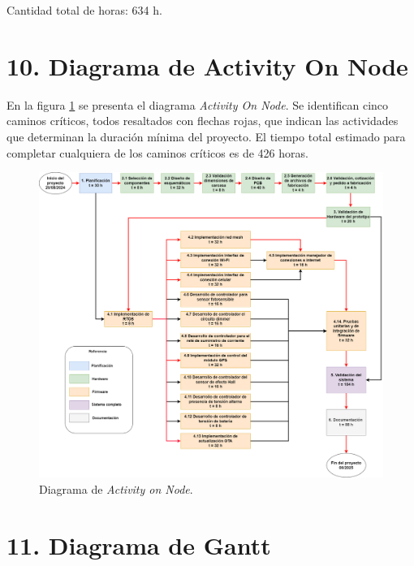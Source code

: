 \documentclass[
11pt, %
]{charter}
\begin{document}
Cantidad total de horas: 634 h.

\pagebreak

\section{10. Diagrama de Activity On Node}
\label{sec:AoN}

En la figura \ref{fig:AoN} se presenta el diagrama \textit{Activity On Node}. Se identifican cinco caminos críticos, todos resaltados con flechas rojas, que indican las actividades que determinan la duración mínima del proyecto. El tiempo total estimado para completar cualquiera de los caminos críticos es de 426 horas.


\begin{figure}[htpb]
\centering 
\includegraphics[width=1\textwidth]{./Figuras/AoN.png}
\caption{Diagrama de \textit{Activity on Node}.}
\label{fig:AoN}
\end{figure}

\section{11. Diagrama de Gantt}
\label{sec:gantt}
\end{document}
